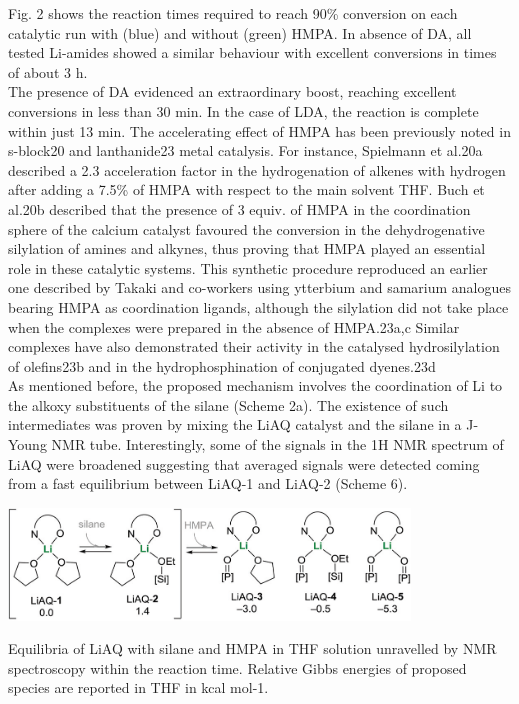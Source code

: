 \documentclass[journal=jacsat,manuscript=article]{achemso}
\begin{document}
	Fig. 2 shows the reaction times required to reach 90\% conversion on each catalytic run with (blue) and without (green)	HMPA. In absence of DA, all tested Li-amides showed a similar	behaviour with excellent conversions in times of about 3 h.
	\\The presence of DA evidenced an extraordinary boost, reaching excellent conversions in less than 30 min. In the case of	LDA, the reaction is complete within just 13 min. The accelerating effect of HMPA has been previously noted in s-block20 and lanthanide23 metal catalysis. For instance, Spielmann et al.20a	described a 2.3 acceleration factor in the hydrogenation of
	alkenes with hydrogen after adding a 7.5\% of HMPA with	respect to the main solvent THF. Buch et al.20b described that
	the presence of 3 equiv. of HMPA in the coordination sphere of the calcium catalyst favoured the conversion in the dehydrogenative	silylation of amines and alkynes, thus proving that HMPA played an essential role in these catalytic systems. This synthetic	procedure reproduced an earlier one described by Takaki and	co-workers using ytterbium and samarium analogues bearing HMPA as coordination ligands, although the silylation did not take place when the complexes were prepared in the absence of HMPA.23a,c Similar complexes have also demonstrated their activity in the catalysed hydrosilylation of olefins23b and in the hydrophosphination of conjugated dyenes.23d
	\\As mentioned before, the proposed mechanism involves the	coordination of Li to the alkoxy substituents of the silane	(Scheme 2a). The existence of such intermediates was proven by mixing the LiAQ catalyst and the silane in a J-Young NMR tube. Interestingly, some of the signals in the 1H NMR spectrum of LiAQ were broadened suggesting that averaged signals were detected coming from a fast equilibrium between LiAQ-1 and LiAQ-2 (Scheme 6).
	
	\begin{scheme}[H]
	\includegraphics[width=0.8\textwidth]{figures/Equilibria.PNG}		
	\centering
	\caption{Equilibria of LiAQ with silane and HMPA in THF solution unravelled by NMR spectroscopy within the reaction time. Relative Gibbs energies of proposed species are reported in THF in kcal mol-1.}
	\label{Scheme6}
	\end{scheme}
\end{document}
